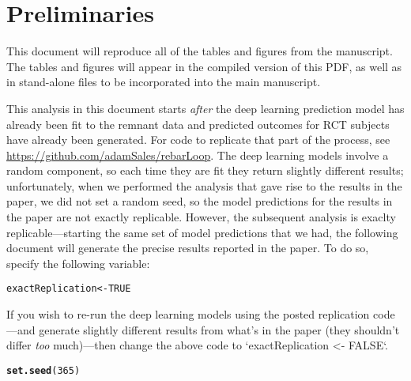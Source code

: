 \documentclass[12pt]{article}\usepackage[]{graphicx}\usepackage[]{xcolor}
\makeatletter
\newcommand{\hlnum}[1]{\textcolor[rgb]{0.686,0.059,0.569}{#1}}%
\newcommand{\hlstd}[1]{\textcolor[rgb]{0.345,0.345,0.345}{#1}}%
\newcommand{\hlkwb}[1]{\textcolor[rgb]{0.69,0.353,0.396}{#1}}%
\newcommand{\hlkwd}[1]{\textcolor[rgb]{0.737,0.353,0.396}{\textbf{#1}}}%
\newenvironment{kframe}{%
 \def\at@end@of@kframe{}%
 \ifinner\ifhmode%
  \def\at@end@of@kframe{\end{minipage}}%
  \begin{minipage}{\columnwidth}%
 \fi\fi%
 \def\FrameCommand##1{\hskip\@totalleftmargin \hskip-\fboxsep
 \colorbox{shadecolor}{##1}\hskip-\fboxsep
     \hskip-\linewidth \hskip-\@totalleftmargin \hskip\columnwidth}%
 \MakeFramed {\advance\hsize-\width
   \@totalleftmargin\z@ \linewidth\hsize
   \@setminipage}}%
 {\par\unskip\endMakeFramed%
 \at@end@of@kframe}
\newenvironment{knitrout}{}{} %
\makeatother
\begin{document}
\section{Preliminaries}

This document will reproduce all of the tables and figures from the
manuscript. The tables and figures will appear in the compiled version
of this PDF, as well as in stand-alone files to be incorporated into
the main manuscript.


This analysis in this document starts \emph{after} the deep learning prediction model has already been fit to the remnant data and predicted outcomes for RCT subjects have already been generated. For code to replicate that part of the process, see \url{https://github.com/adamSales/rebarLoop}. 
The deep learning models involve a random component, so each time they are fit they return slightly different results; unfortunately, when we performed the analysis that gave rise to the results in the paper, we did not set a random seed, so the model predictions for the results in the paper are not exactly replicable. 
However, the subsequent analysis is exaclty replicable---starting the same set of model predictions that we had, the following document will generate the precise results reported in the paper. 
To do so, specify the following variable:

\begin{knitrout}
\color{fgcolor}\begin{kframe}
\begin{alltt}
\hlstd{exactReplication} \hlkwb{<-} \hlnum{TRUE}
\end{alltt}
\end{kframe}
\end{knitrout}

If you wish to re-run the deep learning models using the posted replication code---and generate slightly different results from what's in the paper (they shouldn't differ \emph{too} much)---then change the above code to `exactReplication <- FALSE`.


\begin{knitrout}
\color{fgcolor}\begin{kframe}
\begin{alltt}
\hlkwd{set.seed}\hlstd{(}\hlnum{365}\hlstd{)}
\end{alltt}
\end{kframe}
\end{knitrout}
\end{document}
